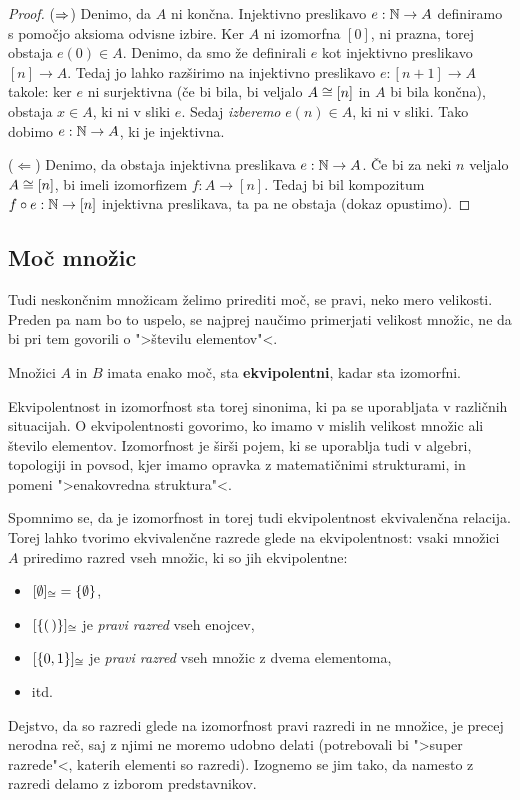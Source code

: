 \begin{proof}

($\Rightarrow$)
%
Denimo, da $A$ ni končna.
Injektivno preslikavo $e : \mathbb{N} \to A$ definiramo s pomočjo aksioma odvisne izbire.
Ker $A$ ni izomorfna $[0]$, ni prazna, torej obstaja $e(0) \in A$.
Denimo, da smo že definirali $e$ kot injektivno preslikavo $[n] \to A$.
Tedaj jo lahko razširimo na injektivno preslikavo $e : [n+1] \to A$ takole: ker $e$ ni surjektivna (če bi bila, bi veljalo $A \cong [n]$ in $A$ bi bila končna), obstaja $x \in A$, ki ni v sliki $e$.
Sedaj \emph{izberemo} $e(n) \in A$, ki ni v sliki.
Tako dobimo $e : \mathbb{N} \to A$, ki je injektivna.

($\Leftarrow$)
%
Denimo, da obstaja injektivna preslikava $e : \mathbb{N} \to A$.
Če bi za neki $n$ veljalo $A \cong [n]$, bi imeli izomorfizem $f : A \to [n]$.
Tedaj bi bil kompozitum $f \circ e : \mathbb{N} \to [n]$ injektivna preslikava, ta pa ne obstaja (dokaz opustimo).
\end{proof}

\subsection{Moč množic}

Tudi neskončnim množicam želimo prirediti moč, se pravi, neko mero velikosti. Preden pa nam bo to uspelo, se najprej naučimo primerjati velikost množic, ne da bi pri tem govorili o ">številu elementov"<.

\begin{definicija}
  Množici $A$ in $B$ imata enako moč, sta \textbf{ekvipolentni}, kadar sta izomorfni.
\end{definicija}

Ekvipolentnost in izomorfnost sta torej sinonima, ki pa se uporabljata v različnih situacijah. O ekvipolentnosti govorimo, ko imamo v mislih velikost množic ali število elementov. Izomorfnost je širši pojem, ki se uporablja tudi v algebri, topologiji in povsod, kjer imamo opravka z matematičnimi strukturami, in pomeni ">enakovredna struktura"<.

Spomnimo se, da je izomorfnost in torej tudi ekvipolentnost ekvivalenčna relacija.
Torej lahko tvorimo ekvivalenčne razrede glede na ekvipolentnost: vsaki množici $A$ priredimo razred vseh množic, ki so jih ekvipolentne:
%
\begin{itemize}
\item $[\emptyset]_{\cong} = \{ \emptyset \}$,
\item $[\left\{ (\,) \right\}]_{\cong}$ je \emph{pravi razred} vseh enojcev,
\item $[\left\{0, 1\right\}]_{\cong}$ je \emph{pravi razred} vseh množic z dvema elementoma,
\item itd.
\end{itemize}
%
Dejstvo, da so razredi glede na izomorfnost pravi razredi in ne množice, je precej nerodna reč, saj z njimi ne moremo udobno delati (potrebovali bi ">super razrede"<, katerih elementi so razredi).
Izognemo se jim tako, da namesto z razredi delamo z izborom predstavnikov.

